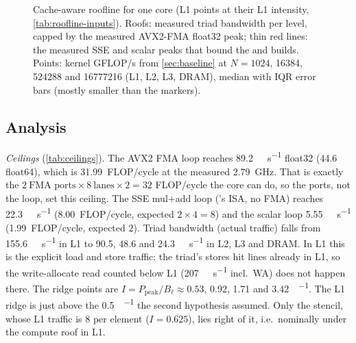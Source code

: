 \begin{figure}[tbp]
{%
  }
  \caption{Cache-aware roofline for one core (L1 points at their L1 intensity,
  \cref{tab:roofline-inputs}). Roofs: measured triad bandwidth per level, capped by the
  measured AVX2-FMA float32 peak; thin red lines: the measured SSE and scalar peaks that bound the
   and  builds. Points: kernel GFLOP/s from \cref{sec:baseline} at
  $N=\num{1024}$, \num{16384}, \num{524288} and \num{16777216} (L1, L2, L3, DRAM), median with IQR error bars (mostly smaller than the markers).}\label{fig:roofline}
\end{figure}

\subsection{Analysis}
\emph{Ceilings} (\cref{tab:ceilings}). The AVX2 FMA loop reaches \qty{89.2}{\giga\flop\per\second}
float32 (\num{44.6} float64), which is \num{31.99}~FLOP/cycle at the measured
\qty{2.79}{\giga\hertz}. That is exactly the $2~\text{FMA ports} \times 8~\text{lanes} \times 2 = 32$
FLOP/cycle the core can do, so the ports, not the loop, set this ceiling. The SSE mul+add loop
('s ISA, no FMA) reaches \qty{22.3}{\giga\flop\per\second} (\num{8.00}~FLOP/cycle,
expected $2\times4=8$) and the scalar loop \qty{5.55}{\giga\flop\per\second}
(\num{1.99}~FLOP/cycle, expected $2$). Triad bandwidth (actual traffic) falls from
\qty{155.6}{\gibi\byte\per\second} in L1 to \num{90.5}, \num{48.6} and
\qty{24.3}{\gibi\byte\per\second} in L2, L3 and DRAM. In L1 this is the explicit load and store
traffic: the triad's stores hit lines already in L1, so the write-allocate read counted below L1
(\qty{207}{\gibi\byte\per\second} incl.\ WA) does not happen there. The ridge points are
$I = P_{\text{peak}}/B_\ell \approx \num{0.53}$, \num{0.92}, \num{1.71} and
\qty{3.42}{\flop\per\byte}. The L1 ridge is just above the \qty{0.5}{\flop\per\byte} the second
hypothesis assumed. Only the stencil, whose L1 traffic is \qty{8}{\byte} per element
($I=\num{0.625}$), lies right of it, i.e.\ nominally under the compute roof in L1.

